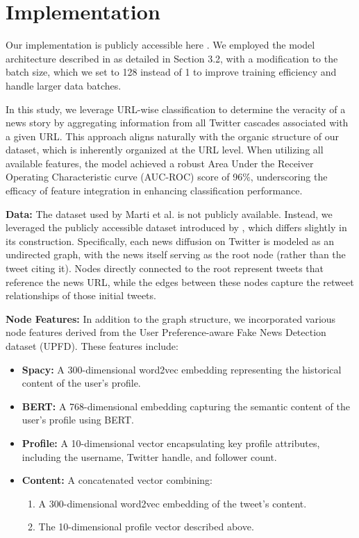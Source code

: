 \documentclass[sigconf,nonacm]{acmart}
\begin{document}
\section{Implementation}

Our implementation is publicly accessible here \cite{github}. We employed the model architecture described in \cite{monti2019fakenewsdetectionsocial} as detailed in Section 3.2, with a modification to the batch size, which we set to 128 instead of 1 to improve training efficiency and handle larger data batches.

In this study, we leverage URL-wise classification to determine the veracity of a news story by aggregating information from all Twitter cascades associated with a given URL. This approach aligns naturally with the organic structure of our dataset, which is inherently organized at the URL level. When utilizing all available features, the model achieved a robust Area Under the Receiver Operating Characteristic curve (AUC-ROC) score of 96\%, underscoring the efficacy of feature integration in enhancing classification performance.

\textbf{Data:} The dataset used by Marti et al. is not publicly available. Instead, we leveraged the publicly accessible dataset introduced by \cite{10.1145/3404835.3462990}, which differs slightly in its construction. Specifically, each news diffusion on Twitter is modeled as an undirected graph, with the news itself serving as the root node (rather than the tweet citing it). Nodes directly connected to the root represent tweets that reference the news URL, while the edges between these nodes capture the retweet relationships of those initial tweets.

\textbf{Node Features:} In addition to the graph structure, we incorporated various node features derived from the User Preference-aware Fake News Detection dataset (UPFD). These features include:
\begin{itemize}
    \item \textbf{Spacy:} A 300-dimensional word2vec embedding representing the historical content of the user's profile.
    \item \textbf{BERT:} A 768-dimensional embedding capturing the semantic content of the user’s profile using BERT.
    \item \textbf{Profile:} A 10-dimensional vector encapsulating key profile attributes, including the username, Twitter handle, and follower count.
    \item \textbf{Content:} A concatenated vector combining:
    \begin{enumerate}
        \item A 300-dimensional word2vec embedding of the tweet's content.
        \item The 10-dimensional profile vector described above.
    \end{enumerate}
\end{itemize}
\end{document}
